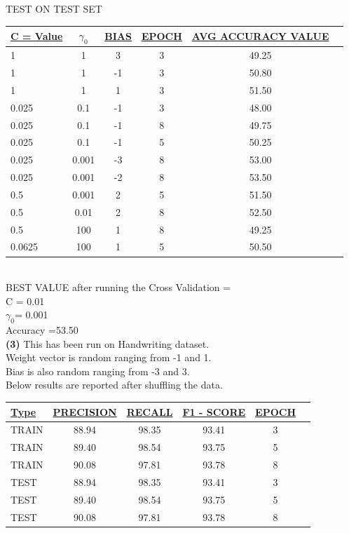 \documentclass[11pt]{article}
\renewcommand\part[1]{\vspace{.10in}\textbf{(#1)}}
\begin{document}
TEST ON TEST SET\\
\bgroup 
\def\arraystretch{1.2}
\begin{tabular}{|l|c|c|c|c|c|} \hline 
{\bf \underline {C = Value}} & {\bf \underline {$\gamma_{0}$}} & {\bf \underline {BIAS}} & {\bf \underline {EPOCH}} & {\bf \underline {AVG ACCURACY VALUE}} \\ \hline
1 & 1 & 3 & 3 & 49.25 \\ \hline
1 & 1 & -1 & 3 & 50.80\\ \hline
1 & 1 & 1 & 3 & 51.50\\ \hline
0.025 & 0.1 & -1 & 3 & 48.00\\ \hline
0.025 & 0.1 & -1 & 8 & 49.75\\ \hline
0.025 & 0.1 & -1 & 5 & 50.25\\ \hline
0.025 & 0.001 & -3 & 8 & 53.00 \\ \hline
0.025 & 0.001 & -2 & 8 & 53.50\\ \hline
0.5 & 0.001 & 2 & 5 & 51.50\\ \hline
0.5 & 0.01 & 2 & 8 & 52.50\\ \hline
0.5 & 100 & 1 & 8 & 49.25\\ \hline
0.0625 & 100 & 1 & 5 & 50.50\\ \hline

\end{tabular}
\egroup\\[20pt]

BEST VALUE after running the Cross Validation =\\
C = 0.01\\
$\gamma_{0}$= 0.001\\
Accuracy =53.50\\

\part{3}
This has been run on Handwriting dataset.\\
Weight vector is random ranging from -1 and 1.\\
Bias is also random ranging from -3 and 3.\\
Below results are reported after shuffling the data.\\[15pt]
\bgroup 
\def\arraystretch{1.2}
\begin{tabular}{|l|c|c|c|c|c|} \hline 
{\bf \underline {Type}} & {\bf \underline {PRECISION}} & {\bf \underline {RECALL}} & {\bf \underline {F1 - SCORE}} & {\bf \underline {EPOCH}}\\ \hline
TRAIN & 88.94 & 98.35 & 93.41 & 3\\ \hline
TRAIN & 89.40 & 98.54 & 93.75 & 5\\ \hline
TRAIN & 90.08 & 97.81 & 93.78 & 8\\ \hline
TEST & 88.94 & 98.35 & 93.41 & 3\\ \hline
TEST & 89.40 & 98.54 & 93.75 & 5\\ \hline
TEST & 90.08 & 97.81 & 93.78 & 8\\ \hline


\end{tabular}
\egroup\\[20pt]
\end{document}
